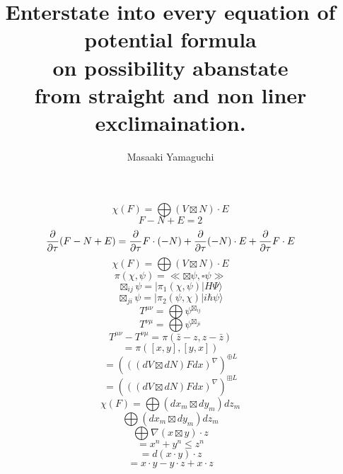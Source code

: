 \documentclass{jsarticle}
\begin{document}
\title{Enterstate into every equation of potential formula \\
on possibility abanstate \\ 
from straight and non liner exclimaination.}
\author{Masaaki Yamaguchi}
\date{}
\maketitle

  $$ \chi(F) = \bigoplus (V \boxtimes N)\cdot E $$
  $$ F - N + E = 2$$
  $$ {\partial \over {\partial \tau}}(F - N + E) = {\partial \over {
	  \partial \tau}}F\cdot (-N) + {\partial \over {\partial \tau}}
  (-N)\cdot E + {\partial \over {\partial \tau}}F\cdot E $$
  $$ \chi(F) = \bigoplus (V \boxtimes N)\cdot E $$
  $$ \pi(\chi,\psi) = \ll \boxtimes \psi, \square \psi \gg $$ 
  $$ \boxtimes_{ij} \psi = |\pi_1(\chi,\psi)|H \Psi \rangle $$
  $$ \boxtimes_{ji} \psi = |\pi_2(\psi,\chi)|i \hbar \psi \rangle $$
  $$ T^{\mu\nu} = \bigoplus \psi^{\boxtimes_{ij}} $$
  $$ T^{\nu\mu} = \bigoplus \psi^{\boxtimes_{ji}} $$
  $$ T^{\mu\nu} - T^{\nu\mu} = \pi(\bar{z} - z, z - \bar{z}) $$
  $$ = \pi([x,y],[y,x]) $$
  $$ = {(((dV\boxtimes dN)Fdx)^{\nabla})}^{\oplus L} $$
  $$ = {(((dV\boxtimes dN)Fdx)^{\nabla})}^{\boxplus L} $$
  $$ \chi(F) = \bigoplus(dx_m \boxtimes dy_m)dz_m $$
  $$ \bigoplus (dx_m \boxtimes dy_m)dz_m $$
  $$ \bigoplus \nabla(x \boxtimes y)\cdot z $$
  $$ = x^n + y^n \le z^n $$
  $$ = d(x\cdot y)\cdot z $$
  $$ = x \cdot y - y \cdot z + x \cdot z $$
\end{document}

